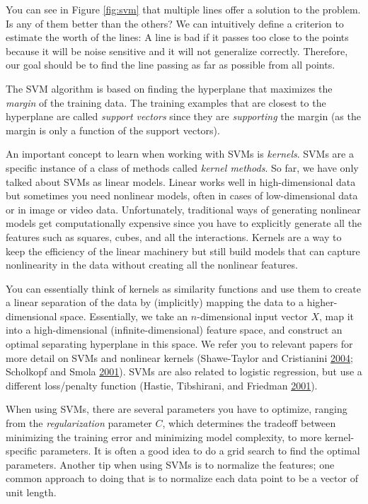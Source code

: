 \documentclass[]{krantz}
\begin{document}
You can see in Figure \ref{fig:svm} that multiple lines offer a solution
to the problem. Is any of them better than the others? We can
intuitively define a criterion to estimate the worth of the lines: A
line is bad if it passes too close to the points because it will be
noise sensitive and it will not generalize correctly. Therefore, our
goal should be to find the line passing as far as possible from all
points.

The SVM algorithm is based on finding the hyperplane that maximizes the
\emph{margin} of the training data. The training examples that are
closest to the hyperplane are called \emph{support vectors} since they
are \emph{supporting} the margin (as the margin is only a function of
the support vectors).

An important concept to learn when working with SVMs is \emph{kernels}.
SVMs are a specific instance of a class of methods called \emph{kernel
methods}. So far, we have only talked about SVMs as linear models.
Linear works well in high-dimensional data but sometimes you need
nonlinear models, often in cases of low-dimensional data or in image or
video data. Unfortunately, traditional ways of generating nonlinear
models get computationally expensive since you have to explicitly
generate all the features such as squares, cubes, and all the
interactions. Kernels are a way to keep the efficiency of the linear
machinery but still build models that can capture nonlinearity in the
data without creating all the nonlinear features.

You can essentially think of kernels as similarity functions and use
them to create a linear separation of the data by (implicitly) mapping
the data to a higher-dimensional space. Essentially, we take an
\(n\)-dimensional input vector \(X\), map it into a high-dimensional
(infinite-dimensional) feature space, and construct an optimal
separating hyperplane in this space. We refer you to relevant papers for
more detail on SVMs and nonlinear kernels (Shawe-Taylor and Cristianini
\protect\hyperlink{ref-ShaweTaylor2004}{2004}; Scholkopf and Smola
\protect\hyperlink{ref-Scholkopf2001}{2001}). SVMs are also related to
logistic regression, but use a different loss/penalty function (Hastie,
Tibshirani, and Friedman
\protect\hyperlink{ref-HastieTibshirani}{2001}).

When using SVMs, there are several parameters you have to optimize,
ranging from the \emph{regularization} parameter \(C\), which determines
the tradeoff between minimizing the training error and minimizing model
complexity, to more kernel-specific parameters. It is often a good idea
to do a grid search to find the optimal parameters. Another tip when
using SVMs is to normalize the features; one common approach to doing
that is to normalize each data point to be a vector of unit length.
\end{document}
